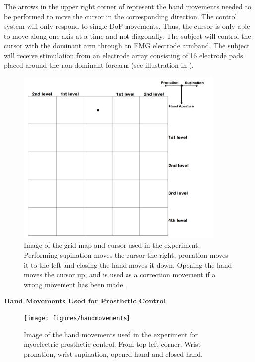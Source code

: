 The arrows in the upper right corner of  represent the hand movements needed to be performed to move the cursor in the corresponding direction. The control system will only respond to single DoF movements. Thus, the cursor is only able to move along one axis at a time and not diagonally. The subject will control the cursor with the dominant arm through an EMG electrode armband. The subject will receive stimulation from an electrode array consisting of 16 electrode pads placed around the non-dominant forearm (see illustration in ).



\begin{figure}[H]                 
	\includegraphics[width=0.9\textwidth]{figures/gridmap2}  
	\caption{Image of the grid map and cursor used in the experiment. Performing supination moves the cursor the right, pronation moves it to the left and closing the hand moves it down. Opening the hand moves the cursor up, and is used as a correction movement if a wrong movement has been made.}
	\label{fig:gridmap} 
\end{figure}
\newpage

\noindent\textbf{{\Large Hand Movements Used for Prosthetic Control}} \\

\begin{figure}[H]                 
	\texttt{[image: figures/handmovements]}
	\caption{Image of the hand movements used in the experiment for myoelectric prosthetic control. From top left corner: Wrist pronation, wrist supination, opened hand and closed hand.}
	\label{fig:handmovements} 
\end{figure}

